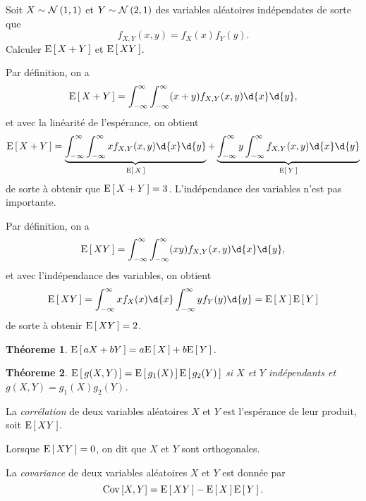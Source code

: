\documentclass[11pt]{article}
\newcommand\Norm[2]{%
	\ensuremath{%
		\mathcal{N}\left(#1,#2\right)%
	}%
}%
\newcommand\Esp[1]{%
	\ensuremath{%
		\mathrm{E}\left[\,#1\,\right]%
	}%
}%
\newcommand\Cov[2]{%
	\ensuremath{%
		\mathrm{Cov}\left[#1,#2\right]%
	}%
}%
\newtheorem{theoreme}{Théoreme}[section]
\begin{document}
\begin{exemple}
	Soit $X\sim\Norm{1}{1}$ et $Y\sim\Norm{2}{1}$ des variables aléatoires
	indépendates de sorte que
	\begin{equation*}
		f_{X,Y}(x,y)=f_X(x)f_Y(y).
	\end{equation*}
	Calculer $\Esp{X+Y}$ et $\Esp{XY}$.

	Par définition, on a
	\begin{equation*}
		\Esp{X+Y}
		=\int_{-\infty}^\infty\int_{-\infty}^\infty(x+y)f_{X,Y}(x,y)\d{x}\d{y},
	\end{equation*}
	et avec la linéarité de l'espérance, on obtient
	\begin{equation*}
		\Esp{X+Y}
		=\underbrace{\int_{-\infty}^\infty\int_{-\infty}^\infty
		 xf_{X,Y}(x,y)\d{x}\d{y}}_{\Esp{X}}
		+\underbrace{\int_{-\infty}^\infty
		 y\int_{-\infty}^\infty f_{X,Y}(x,y)\d{x}\d{y}}_{\Esp{Y}}
	\end{equation*}
	de sorte à obtenir que $\Esp{X+Y}=3$. L'indépendance des variables n'est
	pas importante.

	Par définition, on a
	\begin{equation*}
		\Esp{XY}
		=\int_{-\infty}^\infty\int_{-\infty}^\infty(xy)f_{X,Y}(x,y)\d{x}\d{y},
	\end{equation*}
	et avec l'indépendance des variables, on obtient
	\begin{equation*}
		\Esp{XY}
		=\int_{-\infty}^\infty xf_X(x)\d{x}\int_{-\infty}^\infty yf_Y(y)\d{y}
		=\Esp{X}\Esp{Y}
	\end{equation*}
	de sorte à obtenir $\Esp{XY}=2$.
\end{exemple}

\begin{theoreme}
	$\Esp{aX+bY}=a\Esp{X}+b\Esp{Y}$.
\end{theoreme}

\begin{theoreme}
	$\Esp{g(X,Y)}=\Esp{g_1(X)}\Esp{g_2(Y)}$ si $X$ et $Y$ indépendants et
	$g(X,Y)=g_1(X)g_2(Y)$.
\end{theoreme}

\begin{definition}
	La \textit{corrélation} de deux variables aléatoires $X$ et $Y$ est
	l'espérance de leur produit, soit $\Esp{XY}$.
\end{definition}

Lorsque $\Esp{XY}=0$, on dit que $X$ et $Y$ sont orthogonales.

\begin{definition}
	La \textit{covariance} de deux variables aléatoires $X$ et $Y$ est donnée
	par
	\begin{equation*}
		\Cov{X}{Y}=\Esp{XY}-\Esp{X}\Esp{Y}.
	\end{equation*}
\end{definition}
\end{document}
